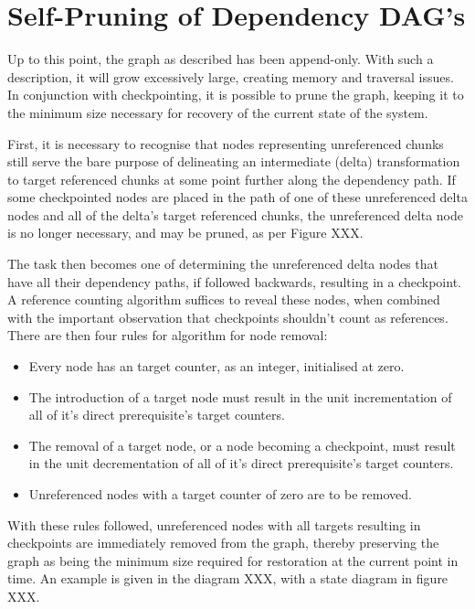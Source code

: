 \documentclass[10pt, a4paper]{article}
\begin{document}
\section{Self-Pruning of Dependency DAG's}

Up to this point, the graph as described has been append-only.
With such a description, it will grow excessively large, creating memory and traversal issues.
In conjunction with checkpointing, it is possible to prune the graph, keeping it to the minimum size necessary for recovery of the current state of the system.

First, it is necessary to recognise that nodes representing unreferenced chunks still serve the bare purpose of delineating an intermediate (delta) transformation to target referenced chunks at some point further along the dependency path.
If some checkpointed nodes are placed in the path of one of these unreferenced delta nodes and all of the delta's target referenced chunks, the unreferenced delta node is no longer necessary, and may be pruned, as per Figure XXX.

The task then becomes one of determining the unreferenced delta nodes that have all their dependency paths, if followed backwards, resulting in a checkpoint.
A reference counting algorithm suffices to reveal these nodes, when combined with the important observation that checkpoints shouldn't count as references.
There are then four rules for algorithm for node removal:
\begin{itemize}
	\item Every node has an target counter, as an integer, initialised at zero.
	\item The introduction of a target node must result in the unit incrementation of all of it's direct prerequisite's target counters.
	\item The removal of a target node, or a node becoming a checkpoint, must result in the unit decrementation of all of it's direct prerequisite's target counters.
	\item Unreferenced nodes with a target counter of zero are to be removed.
\end{itemize}
With these rules followed, unreferenced nodes with all targets resulting in checkpoints are immediately removed from the graph, thereby preserving the graph as being the minimum size required for restoration at the current point in time.
An example is given in the diagram XXX, with a state diagram in figure XXX.

\end{document}

